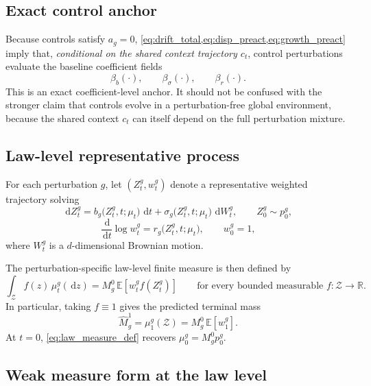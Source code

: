 \documentclass[11pt]{article}
\newcommand{\R}{\mathbb{R}}
\newcommand{\E}{\mathbb{E}}
\newcommand{\dd}{\,\mathrm{d}}
\newcommand{\Zcal}{\mathcal{Z}}
\begin{document}
\subsection{Exact control anchor}

Because controls satisfy $a_g=0$, \cref{eq:drift_total,eq:disp_preact,eq:growth_preact} imply that, \emph{conditional on the shared context trajectory $c_t$}, control perturbations evaluate the baseline coefficient fields
\[
\beta_b(\cdot),
\qquad
\beta_\sigma(\cdot),
\qquad
\beta_r(\cdot).
\]
This is an exact coefficient-level anchor. It should not be confused with the stronger claim that controls evolve in a perturbation-free global environment, because the shared context $c_t$ can itself depend on the full perturbation mixture.

\subsection{Law-level representative process}

For each perturbation $g$, let $(Z_t^g,w_t^g)$ denote a representative weighted trajectory solving
\begin{equation}
\dd Z_t^g
=
b_g\big(Z_t^g,t;\mu_t\big)\,\dd t
+
\sigma_g\big(Z_t^g,t;\mu_t\big)\,\dd W_t^g,
\qquad
Z_0^g \sim p_0^g,
\label{eq:law_sde}
\end{equation}
\begin{equation}
\frac{\dd}{\dd t}\log w_t^g
=
r_g\big(Z_t^g,t;\mu_t\big),
\qquad
w_0^g=1,
\label{eq:law_weight}
\end{equation}
where $W_t^g$ is a $d$-dimensional Brownian motion.

The perturbation-specific law-level finite measure is then defined by
\begin{equation}
\int_{\Zcal} f(z)\,\mu_t^g(\dd z)
=
M_g^0\,\E\!\left[w_t^g f(Z_t^g)\right]
\qquad
\text{for every bounded measurable } f:\Zcal\to\R.
\label{eq:law_measure_def}
\end{equation}
In particular, taking $f\equiv 1$ gives the predicted terminal mass
\begin{equation}
\hat M_g^1
=
\mu_1^g(\Zcal)
=
M_g^0\,\E\!\left[w_1^g\right].
\label{eq:pred_terminal_mass}
\end{equation}
At $t=0$, \cref{eq:law_measure_def} recovers $\mu_0^g=M_g^0p_0^g$.

\subsection{Weak measure form at the law level}
\end{document}

